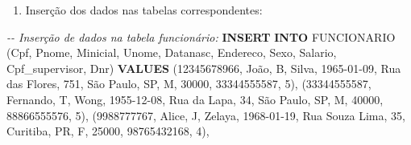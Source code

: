 \documentclass[
]{article}
\newenvironment{Shaded}{\begin{snugshade}}{\end{snugshade}}
\newcommand{\CommentTok}[1]{\textcolor[rgb]{0.56,0.35,0.01}{\textit{#1}}}
\newcommand{\DecValTok}[1]{\textcolor[rgb]{0.00,0.00,0.81}{#1}}
\newcommand{\KeywordTok}[1]{\textcolor[rgb]{0.13,0.29,0.53}{\textbf{#1}}}
\newcommand{\NormalTok}[1]{#1}
\newcommand{\StringTok}[1]{\textcolor[rgb]{0.31,0.60,0.02}{#1}}
\providecommand{\tightlist}{%
  \setlength{\itemsep}{0pt}\setlength{\parskip}{0pt}}
\begin{document}
\begin{enumerate}
\def\labelenumi{\arabic{enumi}.}
\setcounter{enumi}{1}
\tightlist
\item
  Inserção dos dados nas tabelas correspondentes:
\end{enumerate}

\begin{Shaded}
\begin{Highlighting}[]
\CommentTok{{-}{-} Inserção de dados na tabela funcionário:}
\KeywordTok{INSERT} \KeywordTok{INTO}\NormalTok{ FUNCIONARIO (Cpf, Pnome, Minicial, Unome, Datanasc, Endereco, }
\NormalTok{Sexo, Salario, Cpf\_supervisor, Dnr) }\KeywordTok{VALUES}
\NormalTok{(}\StringTok{\textquotesingle{}12345678966\textquotesingle{}}\NormalTok{, }\StringTok{\textquotesingle{}João\textquotesingle{}}\NormalTok{, }\StringTok{\textquotesingle{}B\textquotesingle{}}\NormalTok{, }\StringTok{\textquotesingle{}Silva\textquotesingle{}}\NormalTok{, }\StringTok{\textquotesingle{}1965{-}01{-}09\textquotesingle{}}\NormalTok{, }\StringTok{\textquotesingle{}Rua das Flores, 751, São Paulo, SP\textquotesingle{}}\NormalTok{, }
\StringTok{\textquotesingle{}M\textquotesingle{}}\NormalTok{, }\DecValTok{30000}\NormalTok{, }\StringTok{\textquotesingle{}33344555587\textquotesingle{}}\NormalTok{, }\DecValTok{5}\NormalTok{),}
\NormalTok{(}\StringTok{\textquotesingle{}33344555587\textquotesingle{}}\NormalTok{, }\StringTok{\textquotesingle{}Fernando\textquotesingle{}}\NormalTok{, }\StringTok{\textquotesingle{}T\textquotesingle{}}\NormalTok{, }\StringTok{\textquotesingle{}Wong\textquotesingle{}}\NormalTok{, }\StringTok{\textquotesingle{}1955{-}12{-}08\textquotesingle{}}\NormalTok{, }\StringTok{\textquotesingle{}Rua da Lapa, 34, São Paulo, SP\textquotesingle{}}\NormalTok{, }
\StringTok{\textquotesingle{}M\textquotesingle{}}\NormalTok{, }\DecValTok{40000}\NormalTok{, }\StringTok{\textquotesingle{}88866555576\textquotesingle{}}\NormalTok{, }\DecValTok{5}\NormalTok{),}
\NormalTok{(}\StringTok{\textquotesingle{}9988777767\textquotesingle{}}\NormalTok{, }\StringTok{\textquotesingle{}Alice\textquotesingle{}}\NormalTok{, }\StringTok{\textquotesingle{}J\textquotesingle{}}\NormalTok{, }\StringTok{\textquotesingle{}Zelaya\textquotesingle{}}\NormalTok{, }\StringTok{\textquotesingle{}1968{-}01{-}19\textquotesingle{}}\NormalTok{, }\StringTok{\textquotesingle{}Rua Souza Lima, 35, Curitiba, PR\textquotesingle{}}\NormalTok{, }
\StringTok{\textquotesingle{}F\textquotesingle{}}\NormalTok{, }\DecValTok{25000}\NormalTok{, }\StringTok{\textquotesingle{}98765432168\textquotesingle{}}\NormalTok{, }\DecValTok{4}\NormalTok{),}

\end{Highlighting}
\end{Shaded}
\end{document}
